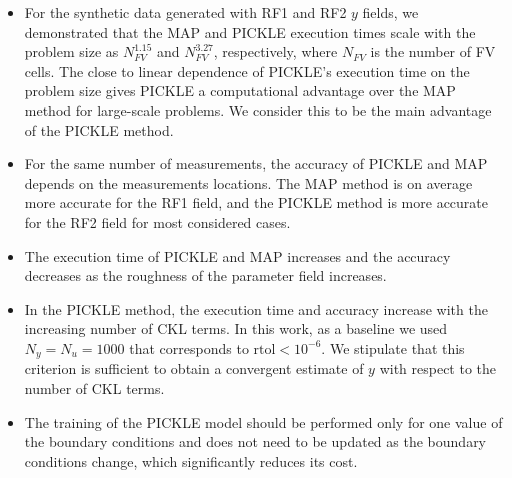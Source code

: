 \documentclass{agujournal2019}
\begin{document}
\begin{itemize}
\item 
  For the synthetic data generated with RF1 and RF2 $y$ fields, we demonstrated that the MAP and PICKLE execution times scale with the problem size as $N_{FV}^{1.15}$ and $N_{FV}^{3.27}$, respectively, where $N_{FV}$ is the number of FV cells.
  The close to linear dependence of PICKLE's execution time on the problem size gives PICKLE a computational advantage over the MAP method for large-scale problems. We consider this to be the main advantage of the PICKLE method. 
 \item For the same number of measurements, the accuracy of PICKLE and MAP depends on the measurements locations. The MAP method is on average more accurate for the RF1 field, and the PICKLE method is  more accurate for the RF2 field for most considered cases.   
 \item The execution time of PICKLE and MAP increases and the accuracy decreases as the roughness of the parameter field increases.
\item In the PICKLE method, the execution time and accuracy increase with the increasing number of CKL terms. In this work, as a baseline we used $N_y=N_u=1000$ that corresponds to $\text{rtol}<10^{-6}$. We stipulate that this criterion is sufficient to obtain a convergent estimate of $y$ with respect to the number of CKL terms. 
\item The training of the PICKLE model should be performed only for one value of the boundary conditions  and does not need to be updated as the boundary conditions change, which significantly reduces its cost.

\end{itemize}
\end{document}
